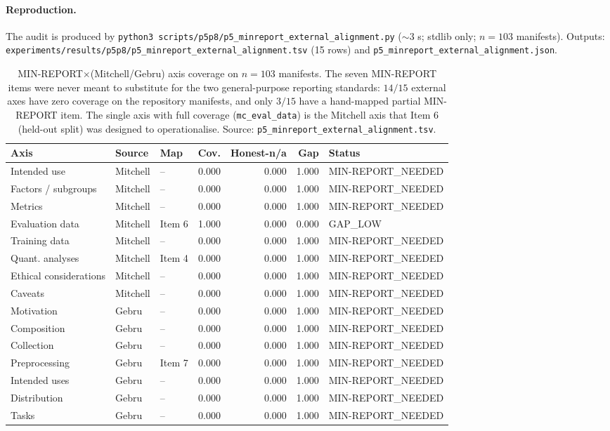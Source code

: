 \paragraph{Reproduction.} The audit is produced by
\texttt{python3 scripts/p5p8/p5\_minreport\_external\_alignment.py}
($\sim$3 s; stdlib only; $n = 103$ manifests).
Outputs:
\texttt{experiments/results/p5p8/p5\_minreport\_external\_alignment.tsv}
(15 rows) and \texttt{p5\_minreport\_external\_alignment.json}.

\begin{table}[t]
\centering
\caption{MIN-REPORT$\times$(Mitchell/Gebru) axis coverage on
$n{=}103$ manifests. The seven MIN-REPORT items were never meant to
substitute for the two general-purpose reporting standards: $14/15$
external axes have zero coverage on the repository manifests, and only
$3/15$ have a hand-mapped partial MIN-REPORT item. The single axis
with full coverage (\texttt{mc\_eval\_data}) is the Mitchell axis
that Item 6 (held-out split) was designed to operationalise.
Source: \texttt{p5\_minreport\_external\_alignment.tsv}.}
\label{tab:p5-external-alignment}
\begin{tabular}{lllrrrl}
\toprule
Axis & Source & Map & Cov. & Honest-n/a & Gap & Status \\
\midrule
Intended use          & Mitchell & --  & 0.000 & 0.000 & 1.000 & MIN-REPORT\_NEEDED \\
Factors / subgroups   & Mitchell & --  & 0.000 & 0.000 & 1.000 & MIN-REPORT\_NEEDED \\
Metrics               & Mitchell & --  & 0.000 & 0.000 & 1.000 & MIN-REPORT\_NEEDED \\
Evaluation data       & Mitchell & Item 6 & 1.000 & 0.000 & 0.000 & GAP\_LOW \\
Training data         & Mitchell & --  & 0.000 & 0.000 & 1.000 & MIN-REPORT\_NEEDED \\
Quant. analyses       & Mitchell & Item 4 & 0.000 & 0.000 & 1.000 & MIN-REPORT\_NEEDED \\
Ethical considerations & Mitchell & -- & 0.000 & 0.000 & 1.000 & MIN-REPORT\_NEEDED \\
Caveats               & Mitchell & --  & 0.000 & 0.000 & 1.000 & MIN-REPORT\_NEEDED \\
\midrule
Motivation            & Gebru    & --  & 0.000 & 0.000 & 1.000 & MIN-REPORT\_NEEDED \\
Composition           & Gebru    & --  & 0.000 & 0.000 & 1.000 & MIN-REPORT\_NEEDED \\
Collection            & Gebru    & --  & 0.000 & 0.000 & 1.000 & MIN-REPORT\_NEEDED \\
Preprocessing         & Gebru    & Item 7 & 0.000 & 0.000 & 1.000 & MIN-REPORT\_NEEDED \\
Intended uses         & Gebru    & --  & 0.000 & 0.000 & 1.000 & MIN-REPORT\_NEEDED \\
Distribution          & Gebru    & --  & 0.000 & 0.000 & 1.000 & MIN-REPORT\_NEEDED \\
Tasks                 & Gebru    & --  & 0.000 & 0.000 & 1.000 & MIN-REPORT\_NEEDED \\
\bottomrule
\end{tabular}
\end{table}

